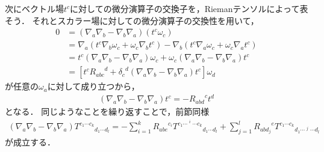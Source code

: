 \documentclass[a4paper]{jsarticle}
\begin{document}
次にベクトル場$t^c$に対しての微分演算子の交換子を，Riemanテンソルによって表そう．
それとスカラー場に対しての微分演算子の交換性を用いて，
\begin{align}
	0 &= \left( \nabla_a \nabla_b - \nabla_b \nabla_a \right)
	\left( t^c \omega_c \right) \\
	&= \nabla_a \left( t^c \nabla_b \omega_c + \omega_c \nabla_b t^c \right)
	- \nabla_b \left( t^c \nabla_a \omega_c + \omega_c \nabla_a t^c \right) \\
	&= t^c \left( \nabla_a \nabla_b - \nabla_b \nabla_a \right) \omega_c
	+ \omega_c \left( \nabla_a \nabla_b - \nabla_b \nabla_a \right) t^c \\
	&= \left[ t^c {R_{abc}}^d
	+ {\delta_c}^d \left( \nabla_a \nabla_b - \nabla_b \nabla_a \right) t^c
	\right]\omega_d
\end{align}
が任意の$\omega_a$に対して成り立つから，
\begin{align}
	\left( \nabla_a \nabla_b - \nabla_b \nabla_a \right) t^c
	= -{R_{abd}}^c t^d
\end{align}
となる．
同じようなことを繰り返すことで，前節同様
\begin{align}
	\left( \nabla_a \nabla_b - \nabla_b \nabla_a \right)
	{T^{c_1 \cdots c_k}}_{d_1 \cdots d_l} =
	- \sum_{i=1}^k {R_{abe}}^{c_i}
		{T^{c_1 \cdots \mathop{\check{e}}^i \cdots c_k}}_{d_1 \cdots d_l}
	+ \sum_{j=1}^l {R_{abd_j}}^e
		{T^{c_1 \cdots c_k}}_{d_1 \cdots \mathop{\check{e}}^j \cdots d_l}
\end{align}
が成立する．
\end{document}
